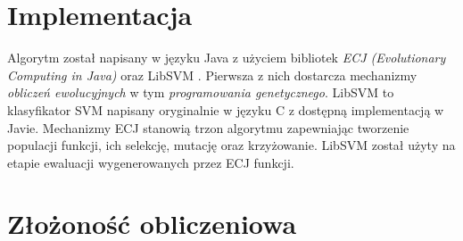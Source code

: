 \section{Implementacja}
Algorytm został napisany w języku Java z użyciem bibliotek \textit{ECJ (Evolutionary Computing in Java)} \cite{sean_ecj_2010} oraz LibSVM \cite{chang_libsvm:_2011}. Pierwsza z nich dostarcza mechanizmy \textit{obliczeń ewolucyjnych} w tym \textit{programowania genetycznego}.
LibSVM to klasyfikator SVM napisany oryginalnie w języku C z dostępną implementacją w Javie.
Mechanizmy ECJ stanowią trzon algorytmu zapewniając tworzenie populacji funkcji, ich selekcję, mutację oraz krzyżowanie. LibSVM został użyty na etapie ewaluacji wygenerowanych przez ECJ funkcji.


\section{Złożoność obliczeniowa}
